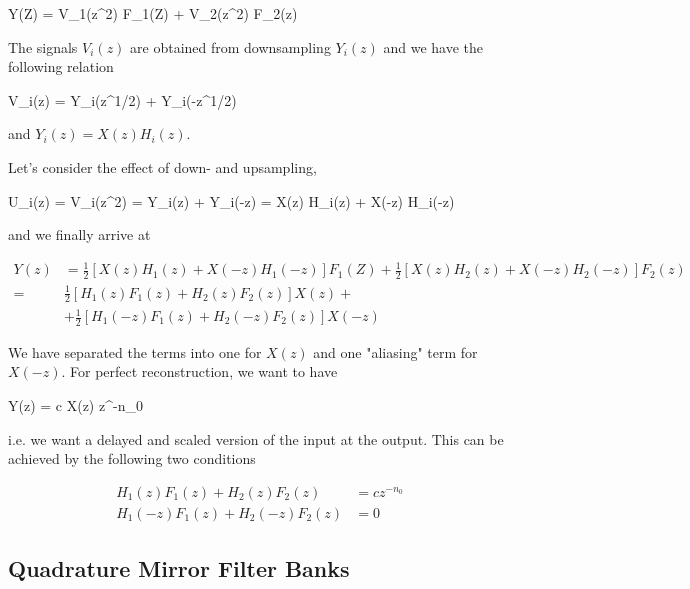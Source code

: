 \bee
Y(Z) = V_1(z^2) F_1(Z) + V_2(z^2) F_2(z)
\eee

The signals $V_i(z)$ are obtained from downsampling $Y_i(z)$ and we have the following relation

\bee
V_i(z) =  Y_i(z^{1/2}) +  Y_i(-z^{1/2})
\eee

and $Y_i(z) = X(z) H_i(z)$.

Let's consider the effect of down- and upsampling,

\bee
U_i(z) = V_i(z^2) =  Y_i(z) +  Y_i(-z) =  X(z) H_i(z) +  X(-z) H_i(-z)
\eee

and we finally arrive at

\begin{align*}
Y(z) &= \frac{1}{2} \left[  X(z) H_1(z) + X(-z) H_1(-z) \right]  F_1(Z) + \frac{1}{2} \left[ X(z) H_2(z) +  X(-z) H_2(-z) \right] F_2(z) \\
= &\frac{1}{2} \left[ H_1(z) F_1(z) + H_2(z) F_2(z) \right] X(z) + \\
&+ \frac{1}{2} \left[ H_1(-z) F_1(z) + H_2(-z) F_2(z) \right] X(-z)
\end{align*}

We have separated the terms into one for $X(z)$ and one "aliasing" term for $X(-z)$. For perfect reconstruction, we want to have

\bee
Y(z) = c X(z) z^{-n_0}
\eee

i.e. we want a delayed and scaled version of the input at the output. This can be achieved by the following two conditions

\begin{align*}
H_1(z) F_1(z) + H_2(z) F_2(z) &= c z^{-n_0} \\
H_1(-z) F_1(z) + H_2(-z) F_2(z) &= 0
\end{align*}


\subsection*{Quadrature Mirror Filter Banks}




